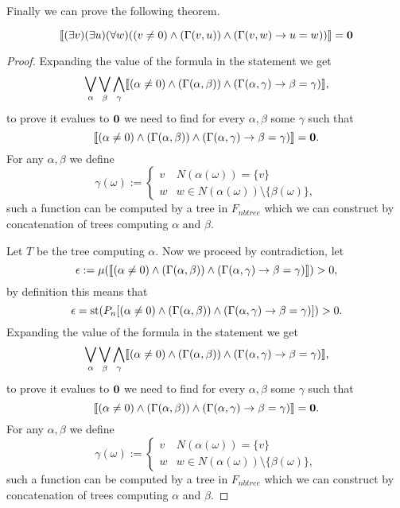 Finally we can prove the following theorem.

\begin{thrm}\label{thrmnoend}
\[\llbracket(\exists v)(\exists u)(\forall w)((v\not=0)\land (\Gamma(v,u)) \land(\Gamma(v,w) \to u=w))\rrbracket=\textbf{0}\]
\end{thrm}
\begin{proof}
Expanding the value of the formula in the statement we get
\[\bigvee_{\alpha}\bigvee_{\beta}\bigwedge_{\gamma}\llbracket(\alpha\not=0)\land (\Gamma(\alpha,\beta)) \land(\Gamma(\alpha,\gamma) \to \beta=\gamma)\rrbracket,\]
to prove it evalues to $\textbf{0}$ we need to find for every $\alpha,\beta$ some $\gamma$ such that
\[\llbracket(\alpha\not=0)\land (\Gamma(\alpha,\beta)) \land(\Gamma(\alpha,\gamma) \to \beta=\gamma)\rrbracket=\textbf{0}.\]
For any $\alpha,\beta$ we define
\[\gamma(\omega):=\begin{cases}v&N(\alpha(\omega))=\{v\}\\w&w\in N(\alpha(\omega))\setminus\{\beta(\omega)\},\end{cases}\]
such a function can be computed by a tree in $F_{nbtree}$ which we can construct by concatenation of trees computing $\alpha$ and $\beta$.

Let $T$ be the tree computing $\alpha$. Now we proceed by contradiction, let
\[\epsilon:=\mu(\llbracket(\alpha\not=0)\land (\Gamma(\alpha,\beta)) \land(\Gamma(\alpha,\gamma) \to \beta=\gamma)\rrbracket)>0,\]
by definition this means that
\[\epsilon=\text{st}(P_n[(\alpha\not=0)\land (\Gamma(\alpha,\beta)) \land(\Gamma(\alpha,\gamma) \to \beta=\gamma)])>0.\]
Expanding the value of the formula in the statement we get
\[\bigvee_{\alpha}\bigvee_{\beta}\bigwedge_{\gamma}\llbracket(\alpha\not=0)\land (\Gamma(\alpha,\beta)) \land(\Gamma(\alpha,\gamma) \to \beta=\gamma)\rrbracket,\]
to prove it evalues to $\textbf{0}$ we need to find for every $\alpha,\beta$ some $\gamma$ such that
\[\llbracket(\alpha\not=0)\land (\Gamma(\alpha,\beta)) \land(\Gamma(\alpha,\gamma) \to \beta=\gamma)\rrbracket=\textbf{0}.\]
For any $\alpha,\beta$ we define
\[\gamma(\omega):=\begin{cases}v&N(\alpha(\omega))=\{v\}\\w&w\in N(\alpha(\omega))\setminus\{\beta(\omega)\},\end{cases}\]
such a function can be computed by a tree in $F_{nbtree}$ which we can construct by concatenation of trees computing $\alpha$ and $\beta$.


\end{proof}
